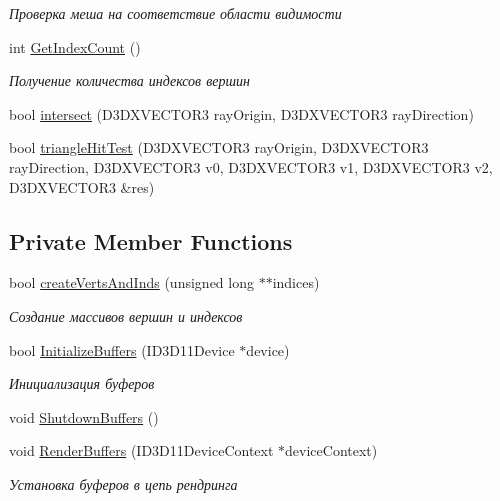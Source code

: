 \begin{DoxyCompactItemize}
\begin{DoxyCompactList}\small\item\em Проверка меша на соответствие области видимости \end{DoxyCompactList}\item 
int \hyperlink{group___meshes_gac93e95f835fa462244dd9cd1af22de52}{Get\+Index\+Count} ()
\begin{DoxyCompactList}\small\item\em Получение количества индексов вершин \end{DoxyCompactList}\item 
bool \hyperlink{group___meshes_gae7ba5327d6a50c4e52bda354b77c1172}{intersect} (D3\+D\+X\+V\+E\+C\+T\+O\+R3 ray\+Origin, D3\+D\+X\+V\+E\+C\+T\+O\+R3 ray\+Direction)
\item 
bool \hyperlink{group___meshes_gaa5a24747a666b2c1b670bce1caa25941}{triangle\+Hit\+Test} (D3\+D\+X\+V\+E\+C\+T\+O\+R3 ray\+Origin, D3\+D\+X\+V\+E\+C\+T\+O\+R3 ray\+Direction, D3\+D\+X\+V\+E\+C\+T\+O\+R3 v0, D3\+D\+X\+V\+E\+C\+T\+O\+R3 v1, D3\+D\+X\+V\+E\+C\+T\+O\+R3 v2, D3\+D\+X\+V\+E\+C\+T\+O\+R3 \&res)
\end{DoxyCompactItemize}
\subsection*{Private Member Functions}
\begin{DoxyCompactItemize}
\item 
bool \hyperlink{group___meshes_ga62e6e1fe0ba4861809bda70f16928c87}{create\+Verts\+And\+Inds} (unsigned long $\ast$$\ast$indices)
\begin{DoxyCompactList}\small\item\em Создание массивов вершин и индексов \end{DoxyCompactList}\item 
bool \hyperlink{group___meshes_gab1b81243c18f1df89eacef16b0c552a0}{Initialize\+Buffers} (I\+D3\+D11\+Device $\ast$device)
\begin{DoxyCompactList}\small\item\em Инициализация буферов \end{DoxyCompactList}\item 
void \hyperlink{group___meshes_gafb9e4d45043b88c956141fc2e1257dd5}{Shutdown\+Buffers} ()
\item 
void \hyperlink{group___meshes_gac70d8b4689d1666f547585fc60c8a21c}{Render\+Buffers} (I\+D3\+D11\+Device\+Context $\ast$device\+Context)
\begin{DoxyCompactList}\small\item\em Установка буферов в цепь рендринга \end{DoxyCompactList}\end{DoxyCompactItemize}
